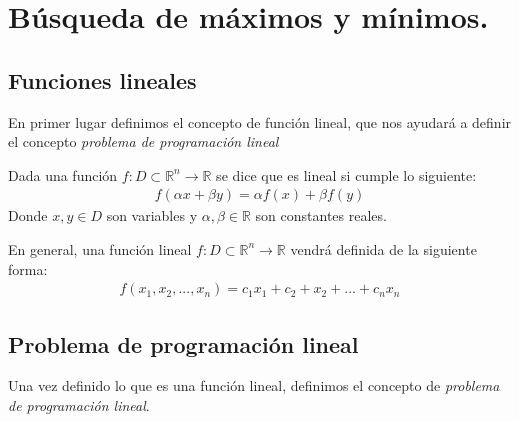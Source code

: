 \documentclass[11pt,fleqn]{book} %
\begin{document}


\chapter{Búsqueda de máximos y mínimos.}
\section{Funciones lineales}
En primer lugar definimos el concepto de función lineal, que nos ayudará a definir el concepto \textit{problema de programación lineal}
\begin{definition}
	Dada una función $f: D\subset\mathbb{R}^n \longrightarrow \mathbb{R}$ se dice que es lineal si cumple lo siguiente:
	\begin{align}
		f(\alpha x + \beta y) = \alpha f(x) + \beta f(y)
	\end{align}
	Donde $x, y \in D$ son variables y $\alpha, \beta \in \mathbb{R}$ son constantes reales.
\end{definition}
En general, una función lineal $f: D\subset \mathbb{R}^n \longrightarrow \mathbb{R}$ vendrá definida de la siguiente forma:
\begin{align}
f(x_1,x_2,...,x_n)=c_1x_1+c_2+x_2+...+c_nx_n
\end{align}
\newpage
\section{Problema de programación lineal}
Una vez definido lo que es una función lineal, definimos el concepto de \textit{problema de programación lineal}.
\end{document}
